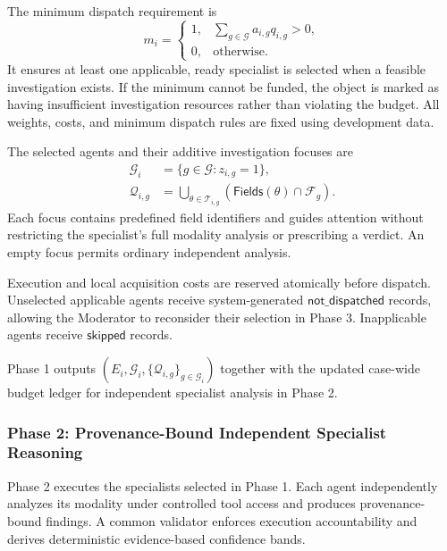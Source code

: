 The minimum dispatch requirement is
\begin{equation}
m_i=
\begin{cases}
1, &
\displaystyle\sum_{g\in\mathcal G}
a_{i,g}q_{i,g}>0,\\
0, & \text{otherwise}.
\end{cases}
\label{eq:minimum-dispatch}
\end{equation}
It ensures at least one applicable,
ready specialist is selected when
a feasible investigation exists.
If the minimum cannot be funded,
the object is marked as having
insufficient investigation resources
rather than violating the budget.
All weights, costs, and minimum
dispatch rules are fixed using
development data.

The selected agents and their
additive investigation focuses are
\begin{equation}
\begin{aligned}
\mathcal G_i
&=\{g\in\mathcal G:z_{i,g}=1\},\\
\mathcal Q_{i,g}
&=\bigcup_{\theta\in\mathcal T_{i,g}}
\left(
\mathsf{Fields}(\theta)
\cap\mathcal F_g
\right).
\end{aligned}
\label{eq:dispatch-focus}
\end{equation}
Each focus contains predefined field
identifiers and guides attention
without restricting the specialist's
full modality analysis or prescribing
a verdict. An empty focus permits
ordinary independent analysis.

Execution and local acquisition costs
are reserved atomically before dispatch.
Unselected applicable agents receive
system-generated
$\mathsf{not\_dispatched}$ records,
allowing the Moderator to reconsider
their selection in Phase 3.
Inapplicable agents receive
$\mathsf{skipped}$ records.

Phase 1 outputs
$(E_i,\mathcal G_i,
\{\mathcal Q_{i,g}\}_{g\in\mathcal G_i})$
together with the updated case-wide
budget ledger for independent
specialist analysis in Phase 2.



\subsubsection*{\textbf{Phase 2: Provenance-Bound
Independent Specialist Reasoning}}
\label{sec:phase2}

Phase 2 executes the specialists selected
in Phase 1. Each agent independently
analyzes its modality under controlled
tool access and produces provenance-bound
findings. A common validator enforces
execution accountability and derives
deterministic evidence-based confidence
bands.


